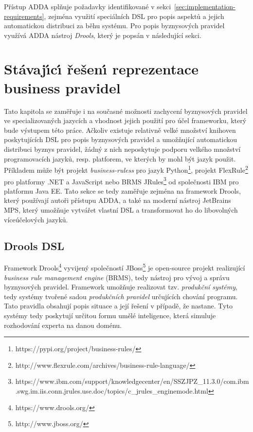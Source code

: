 Přístup \gls{ADDA} splňuje požadavky identifikované v sekci~\ref{sec:implementation-requirements},
zejména využití speciálních \gls{DSL} pro popis aspektů a
jejich automatickou distribuci za běhu systému. Pro popis byznysových pravidel
využívá \gls{ADDA} nástroj \textit{Drools}, který je popsán v následující sekci.

\section{Stávaj\'{\i}c\'{\i} řešen\'{\i} reprezentace business pravidel}\label{sec:business-rule-dsl}

Tato kapitola se zaměřuje i na současné možnosti zachycení
byznysových pravidel ve specializovaných jazycích a vhodnost jejich použití
pro účel frameworku, který bude výstupem této práce.
Ačkoliv existuje relativně velké množství knihoven poskytujících
\gls{DSL} pro popis byznysových pravidel a umožňující automatickou
distribuci byznys pravidel, žádný z nich neposkytuje podporu velkého
množství programovacích jazyků, resp. platforem, ve kterých by mohl
být jazyk použit. Příkladem může být projekt \textit{business-ruless}
pro jazyk Python\footnote{https://pypi.org/project/business-rules/}, projekt FlexRule\footnote{http://www.flexrule.com/archives/business-rule-language/} pro platformy .NET a
JavaScript nebo \gls{BRMS} JRules\footnote{https://www.ibm.com/support/knowledgecenter/en/SSZJPZ\_11.3.0/com.ibm.swg.im.iis.conn.jrules.use.doc/topics/c\_jrules\_enginemode.html} od společnosti IBM pro platformu \gls{Java EE}.
Tato sekce se tedy zaměřuje zejména na framework Drools, který
používají autoři přístupu \gls{ADDA}, a také na moderní nástroj
JetBrains MPS, který umožňuje vytvářet vlastní \gls{DSL} a transformovat
ho do libovolných víceúčelových jazyků.

\subsection{Drools DSL}

Framework Drools\footnote{https://www.drools.org/} vyvijený společností JBoss\footnote{http://www.jboss.org/}
je open-source projekt realizující \textit{business rule management engine} (\gls{BRMS}),
tedy nástroj pro vývoj a správu byznysových pravidel. Framework umožňuje realizovat
tzv. \textit{produkční systémy}, tedy systémy tvořené sadou \textit{produkčních pravidel}
určujících chování programu. Tato pravidla obsahují popis situace a její řešení v případě,
že nastane. Tyto systémy tedy poskytují určitou formu umělé inteligence, která simuluje
rozhodování experta na danou doménu.

